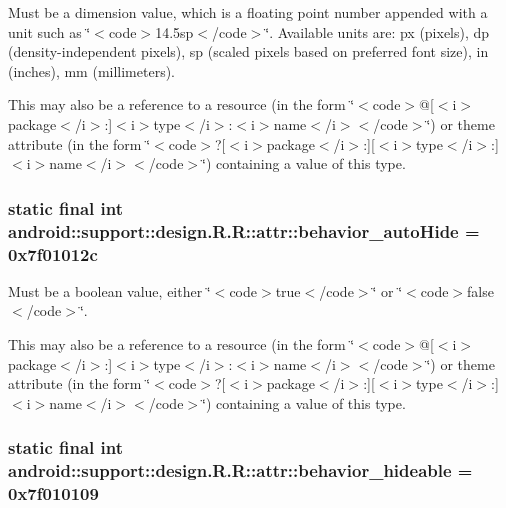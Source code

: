 Must be a dimension value, which is a floating point number appended with a unit such as \char`\"{}$<$code$>$14.5sp$<$/code$>$\char`\"{}. Available units are: px (pixels), dp (density-independent pixels), sp (scaled pixels based on preferred font size), in (inches), mm (millimeters). 

This may also be a reference to a resource (in the form \char`\"{}$<$code$>$@\mbox{[}$<$i$>$package$<$/i$>$:\mbox{]}$<$i$>$type$<$/i$>$:$<$i$>$name$<$/i$>$$<$/code$>$\char`\"{}) or theme attribute (in the form \char`\"{}$<$code$>$?\mbox{[}$<$i$>$package$<$/i$>$:\mbox{]}\mbox{[}$<$i$>$type$<$/i$>$:\mbox{]}$<$i$>$name$<$/i$>$$<$/code$>$\char`\"{}) containing a value of this type. \hypertarget{classandroid_1_1support_1_1design_1_1_r_1_1attr_d05db1c503c733220e3593490dbfdc31}{
\subsubsection[{behavior\_\-autoHide}]{\setlength{\rightskip}{0pt plus 5cm}static final int android::support::design.R.R::attr::behavior\_\-autoHide = 0x7f01012c}}
\label{classandroid_1_1support_1_1design_1_1_r_1_1attr_d05db1c503c733220e3593490dbfdc31}


Must be a boolean value, either \char`\"{}$<$code$>$true$<$/code$>$\char`\"{} or \char`\"{}$<$code$>$false$<$/code$>$\char`\"{}. 

This may also be a reference to a resource (in the form \char`\"{}$<$code$>$@\mbox{[}$<$i$>$package$<$/i$>$:\mbox{]}$<$i$>$type$<$/i$>$:$<$i$>$name$<$/i$>$$<$/code$>$\char`\"{}) or theme attribute (in the form \char`\"{}$<$code$>$?\mbox{[}$<$i$>$package$<$/i$>$:\mbox{]}\mbox{[}$<$i$>$type$<$/i$>$:\mbox{]}$<$i$>$name$<$/i$>$$<$/code$>$\char`\"{}) containing a value of this type. \hypertarget{classandroid_1_1support_1_1design_1_1_r_1_1attr_99d63888ab036432797f28bb897907e2}{
\subsubsection[{behavior\_\-hideable}]{\setlength{\rightskip}{0pt plus 5cm}static final int android::support::design.R.R::attr::behavior\_\-hideable = 0x7f010109}}
\label{classandroid_1_1support_1_1design_1_1_r_1_1attr_99d63888ab036432797f28bb897907e2}


